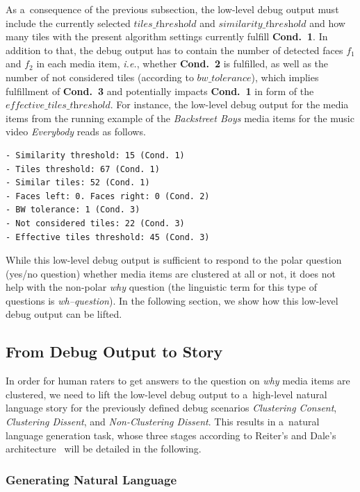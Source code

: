 As a~consequence of the previous subsection, the low-level debug output
must include the currently selected $\textit{tiles\_threshold}$ and
$\textit{similarity\_threshold}$ and how many tiles with the present algorithm settings
currently fulfill \textbf{Cond.~1}.
In addition to that, the debug output has to contain
the number of detected faces $f_1$ and $f_2$ in each media item,
\emph{i.e.}, whether \textbf{Cond.~2} is fulfilled,
as well as the number of not considered tiles
(according to $\textit{bw\_tolerance}$), which implies fulfillment of \textbf{Cond.~3}
and potentially impacts \textbf{Cond.~1} in form of
the $\textit{effective\_tiles\_threshold}$.
For instance, the low-level debug output for the media items
from the running example of the \emph{Backstreet Boys} media items
for the music video \emph{Everybody} reads as follows.

\begin{verbatim}
- Similarity threshold: 15 (Cond. 1)
- Tiles threshold: 67 (Cond. 1)
- Similar tiles: 52 (Cond. 1)
- Faces left: 0. Faces right: 0 (Cond. 2)
- BW tolerance: 1 (Cond. 3)
- Not considered tiles: 22 (Cond. 3)
- Effective tiles threshold: 45 (Cond. 3)
\end{verbatim}

While this low-level debug output is sufficient to respond
to the polar question (yes/no question) whether media items
are clustered at all or not, it does not help with
the non-polar \emph{why} question
(the linguistic term for this type of questions is \emph{wh–question}).
In the following section, we show how
this low-level debug output can be lifted.

\subsection{From Debug Output to Story}
\label{sec:from-debug-output-to-story}

In order for human raters to get answers to the question on
\emph{why} media items are clustered, we need to lift the low-level debug output
to a~high-level natural language story for
the previously defined debug scenarios \textit{Clustering Consent},
\textit{Clustering Dissent}, and \textit{Non-Clustering Dissent}.
This results in a~natural language generation task,
whose three stages according to Reiter's and Dale's
architecture~\cite{reiter2000building} will be detailed in the following.

\subsubsection{Generating Natural Language}
\label{sec:text-to-speech-espeak}


